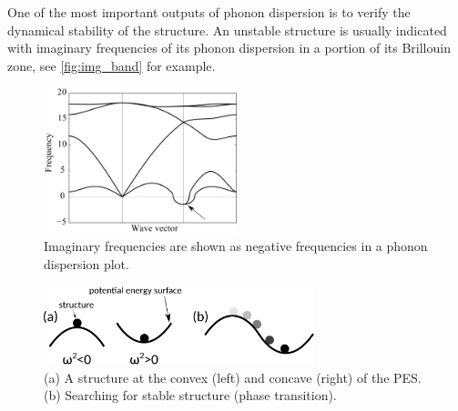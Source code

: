 One of the most important outputs of phonon dispersion is to verify the dynamical stability of the structure. An unstable structure is usually indicated with imaginary frequencies of its phonon dispersion in a portion of its Brillouin zone, see \autoref{fig:img_band} for example. 


\begin{figure}[htbp!] 
\centering  
\includegraphics[width=0.5\textwidth]{img_band.png}
\caption{ Imaginary frequencies are shown as negative frequencies in a phonon dispersion plot.}  
\label{fig:img_band}
\end{figure} 

\begin{figure}[htbp!] 
\centering  
\includegraphics[width=0.7\textwidth]{fre_ima.eps}
\caption{ (a) A structure at the convex (left) and concave (right) of the PES. (b) Searching for stable structure (phase transition).}  
\label{fig:fre_ima}
\end{figure} 

